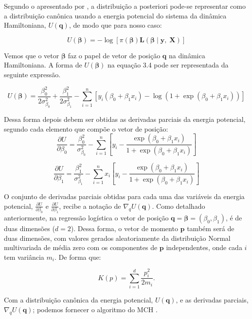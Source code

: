 Segundo o apresentado por , a distribuição a posteriori pode-se representar como a distribuição canônica usando a energia potencial do sistema da dinâmica Hamiltoniana, $U\left(\boldsymbol{q}\right)$, de modo que para nosso caso:

\begin{equation}
U\left(\boldsymbol{\beta}\right)=-\log\left[\pi\left(\boldsymbol{\beta}\right)\mathbf{L}\left(\boldsymbol{\beta}\mid\mathbf{y},\;\mathbf{X}\right)\right]
\end{equation}

\noindent Vemos que o vetor $\boldsymbol{\beta}$ faz o papel de vetor de posição $\bm{q}$ na dinâmica Hamiltoniana. A forma de $U\left(\boldsymbol{\beta}\right)$ na equação 3.4 pode ser representada da seguinte expressão.

\[
U(\bm{\beta})=\frac{\beta_{0}^{2}}{2\sigma_{\beta_{0}}^{2}}+\frac{\beta_{1}^{2}}{2\sigma_{\beta_{1}}^{2}}-\sum_{i=1}^{n}\left[y_{i}\left(\beta_{0}+\beta_{1}x_{i}\right)-\log\left(1+\exp\left(\beta_{0}+\beta_{1}x_{i}\right)\right)\right]
\]

\noindent Dessa forma depois debem ser obtidas as derivadas parciais da energia potencial, segundo cada elemento que compõe o vetor de posição:
\[
\frac{\partial U}{\partial\beta_{0}}=\frac{\beta_{0}^{2}}{\sigma_{\beta_{0}}^{2}}-\sum_{i=1}^{n}\left[y_{i}-\frac{\exp\left(\beta_{0}+\beta_{1}x_{i}\right)}{1+\exp\left(\beta_{0}+\beta_{1}x_{i}\right)}\right]
\]

\[
\frac{\partial U}{\partial\beta_{1}}=\frac{\beta_{1}^{2}}{\sigma_{\beta_{1}}^{2}}-\sum_{i=1}^{n} x_{i}\left[y_{i}-\frac{\exp\left(\beta_{0}+\beta_{1}x_{i}\right)}{1+\exp\left(\beta_{0}+\beta_{1}x_{i}\right)}\right]
\]

\noindent O conjunto de derivadas parciais obtidas para cada uma das variáveis da energia potencial, $\frac{\partial U}{\partial\beta_{0}}$ e $\frac{\partial U}{\partial\beta_{1}}$, recibe a notação de $\nabla_{q}U\left(\bm{q}\right)$. Como detalhado anteriormente, na regressão logística o vetor de posição $\bm{q}=\bm{\beta}=\left(\beta_{0},\beta_{1}\right)$, é de duas dimensões ($d=2$). Dessa forma, o vetor de momento $\bm{p}$ também será de duas dimensões, com valores gerados aleatoriamente da distribuição Normal multivariada de média zero com os componentes de $\bm{p}$ independentes, onde cada $i$ tem variância $m_{i}$. De forma que:

\[
K\left(p\right)=\sum_{i=1}^{d}\frac{p_{i}^{2}}{2m_{i}}.
\]

\noindent Com a distribuição canônica da energia potencial, $U\left(\boldsymbol{q}\right)$, e as derivadas parciais, $\nabla_{q}U\left(\bm{q}\right)$; podemos fornecer o algoritmo do MCH \cite{Neal2012}.

